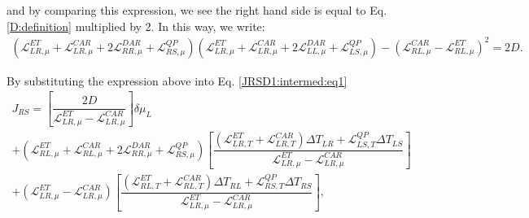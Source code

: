 and by comparing this expression, we see the right hand side is equal to Eq. \eqref{D:definition} multiplied by 2. In this way, we write:
\begin{align*}
(\mathcal{L}_{LR,\mu}^{ET}+\mathcal{L}_{LR,\mu}^{CAR}+2\mathcal{L}_{RR,\mu}^{DAR}+\mathcal{L}^{QP}_{RS,\mu})
(\mathcal{L}_{LR,\mu}^{ET}+\mathcal{L}_{LR,\mu}^{CAR}+2\mathcal{L}_{LL,\mu}^{DAR}+\mathcal{L}^{QP}_{LS,\mu})
-(\mathcal{L}_{RL,\mu}^{CAR}-\mathcal{L}_{RL,\mu}^{ET})^{2}
=2D.
\end{align*}

By substituting the expression above into Eq. \eqref{JRSD1:intermed:eq1}
\begin{multline}\label{JRSD1:intermed:eq2}
J_{RS}=\left[
\dfrac{
2D
}
{\mathcal{L}_{LR,\mu}^{ET}-\mathcal{L}_{LR,\mu}^{CAR}}\right]\delta\mu_{L}
\\+
(\mathcal{L}_{RL,\mu}^{ET}+\mathcal{L}_{RL,\mu}^{CAR}+2\mathcal{L}_{RR,\mu}^{DAR}+\mathcal{L}^{QP}_{RS,\mu})
\left[\dfrac{
(\mathcal{L}_{LR,T}^{ET}+\mathcal{L}_{LR,T}^{CAR})\Delta T_{LR}
+
\mathcal{L}^{QP}_{LS,T}\Delta T_{LS}}{\mathcal{L}_{LR,\mu}^{ET}-\mathcal{L}_{LR,\mu}^{CAR}}\right]
\\+
(\mathcal{L}_{LR,\mu}^{ET}-\mathcal{L}_{LR,\mu}^{CAR})\left[\dfrac{(\mathcal{L}_{RL,T}^{ET}+\mathcal{L}_{RL,T}^{CAR})\Delta T_{RL}
+
\mathcal{L}^{QP}_{RS,T}\Delta T_{RS}}{\mathcal{L}_{LR,\mu}^{ET}-\mathcal{L}_{LR,\mu}^{CAR}}\right],
\end{multline}


